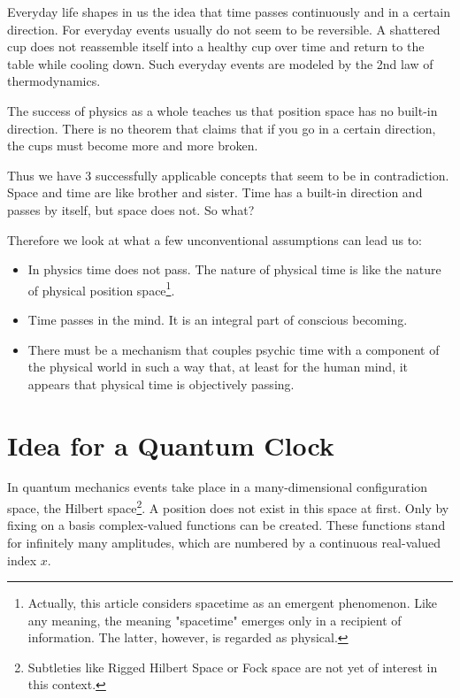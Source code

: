 \documentclass[12pt]{article}
\begin{document}
Everyday life shapes in us the idea that time passes continuously and in a certain direction. For everyday events usually do not seem to be reversible. A shattered cup does not reassemble itself into a healthy cup over time and return to the table while cooling down. Such everyday events are modeled by the 2nd law of thermodynamics.

The success of physics as a whole teaches us that position space has no built-in direction. There is no theorem that claims that if you go in a certain direction, the cups must become more and more broken.

Thus we have 3 successfully applicable concepts that seem to be in contradiction. Space and time are like brother and sister. Time has a built-in direction and passes by itself, but space does not. So what?

Therefore we look at what a few unconventional assumptions can lead us to:

\begin{itemize}
\item In physics time does not pass. The nature of physical time is like the nature of physical position space\footnote{Actually, this article considers spacetime as an emergent phenomenon. Like any meaning, the meaning "spacetime" emerges only in a recipient of information. The latter, however, is regarded as physical.}.
\item Time passes in the mind. It is an integral part of conscious becoming. 
\item There must be a mechanism that couples psychic time with a component of the physical world in such a way that, at least for the human mind, it appears that physical time is objectively passing.
\end{itemize}

\section{Idea for a Quantum Clock}

In quantum mechanics events take place in a many-dimensional configuration space, the Hilbert space\footnote{Subtleties like Rigged Hilbert Space or Fock space are not yet of interest in this context.}. A position does not exist in this space at first. Only by fixing on a basis complex-valued functions can be created. These functions stand for infinitely many amplitudes, which are numbered by a continuous real-valued index $x$.
\end{document}
